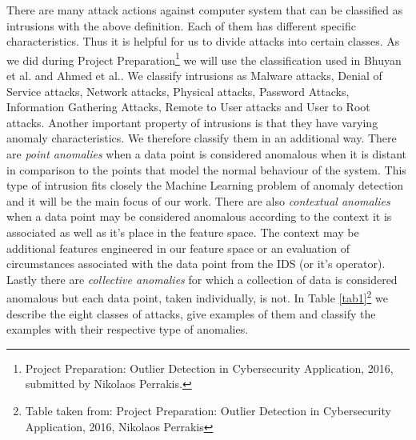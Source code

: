\documentclass[reqno,openany,12pt]{amsbook}
\begin{document}
There are many attack actions against computer system that can be classified as intrusions with the above definition. Each of them has different specific characteristics. Thus it is helpful for us to divide attacks into certain classes. As we did during Project Preparation\footnote{Project Preparation: Outlier Detection in Cybersecurity Application, 2016, submitted by Nikolaos Perrakis.} we will use the classification used in Bhuyan et al.\cite{ids1} and Ahmed et al.\cite{ids2}. We classify intrusions as Malware attacks, Denial of Service attacks, Network attacks, Physical attacks, Password Attacks, Information Gathering Attacks, Remote to User attacks and User to Root attacks.
Another important property of intrusions is that they have varying anomaly characteristics. We therefore classify them in an additional way. There are \emph{point anomalies} when a data point is considered anomalous when it is distant in comparison to the points that model the normal behaviour of the system. This type of intrusion fits closely the Machine Learning problem of anomaly detection and it will be the main focus of our work. There are also \emph{contextual anomalies} when a data point may be considered anomalous according to the context it is associated as well as it's place in the feature space. The context may be additional features engineered in our feature space or an evaluation of circumstances associated with the data point from the IDS (or it's operator). Lastly there are \emph{collective anomalies} for which a collection of data is considered anomalous but each data point, taken individually, is not. In Table \ref{tab1}\footnote{Table taken from: Project Preparation: Outlier Detection in Cybersecurity Application, 2016, Nikolaos Perrakis} we describe the eight classes of attacks, give examples of them and classify the examples with their respective type of anomalies.
\end{document}

